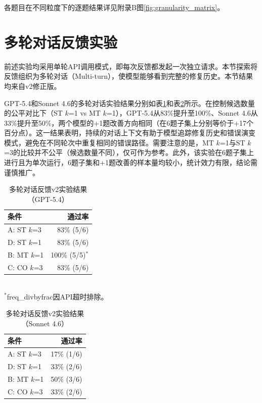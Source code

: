 各题目在不同粒度下的逐题结果详见附录B图\ref{fig:granularity_matrix}。

\section{多轮对话反馈实验}

前述实验均采用单轮API调用模式，即每次反馈都发起一次独立请求。本节探索将反馈组织为多轮对话（Multi-turn），使模型能够看到完整的修复历史。本节结果均来自v2修正版。

GPT-5.4和Sonnet 4.6的多轮对话实验结果分别如表\ref{tab:mt_gpt}和表\ref{tab:mt_sonnet}所示。在控制候选数量的公平对比下（ST $k$=1 vs MT $k$=1），GPT-5.4从83\%提升至100\%、Sonnet 4.6从33\%提升至50\%，两个模型的+1题改善方向相同（在6题子集上分别等价于+17个百分点）。这一结果表明，持续的对话上下文有助于模型追踪修复历史和错误演变模式，避免在不同轮次中重复相同的错误路径。需要注意的是，MT $k$=1与ST $k$=3的比较并不公平（候选数量不同），仅可作为参考。此外，该实验在6题子集上进行且为单次运行，6题子集和+1题改善的样本量均较小，统计效力有限，结论需谨慎推广。

\begin{table}[htbp]
\centering
\caption{多轮对话反馈v2实验结果（GPT-5.4）}
\label{tab:mt_gpt}
\begin{tabular}{lr}
\toprule
条件 & 通过率 \\
\midrule
A: ST $k$=3 & 83\% (5/6) \\
D: ST $k$=1 & 83\% (5/6) \\
B: MT $k$=1 & 100\% (5/5)$^*$ \\
C: CO $k$=3 & 83\% (5/6) \\
\bottomrule
\end{tabular}
\\[4pt]
\small $^*$freq\_divbyfrac因API超时排除。
\end{table}

\begin{table}[htbp]
\centering
\caption{多轮对话反馈v2实验结果（Sonnet 4.6）}
\label{tab:mt_sonnet}
\begin{tabular}{lr}
\toprule
条件 & 通过率 \\
\midrule
A: ST $k$=3 & 17\% (1/6) \\
D: ST $k$=1 & 33\% (2/6) \\
B: MT $k$=1 & 50\% (3/6) \\
C: CO $k$=3 & 33\% (2/6) \\
\bottomrule
\end{tabular}
\end{table}

